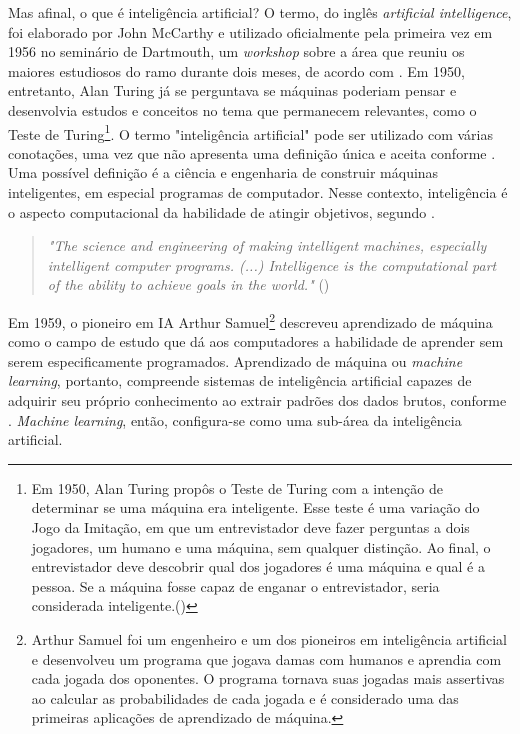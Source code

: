 Mas afinal, o que é inteligência artificial? O termo, do
inglês \textit{artificial intelligence}, foi elaborado por John McCarthy e utilizado 
oficialmente pela primeira vez em 1956 no seminário de 
Dartmouth, um \textit{workshop} sobre a área que reuniu os 
maiores estudiosos do ramo durante dois meses, de acordo com \cite{aima}.
Em 1950, entretanto, Alan Turing já se perguntava se máquinas 
poderiam pensar e desenvolvia estudos e conceitos no tema que permanecem relevantes,
como o Teste de Turing\footnote{Em 1950, Alan Turing propôs o 
Teste de Turing com a intenção de determinar se uma máquina era inteligente. Esse teste é uma variação 
do Jogo da Imitação, em que um entrevistador deve fazer perguntas a dois jogadores, um 
humano e uma máquina, sem qualquer distinção. Ao final, o entrevistador deve
descobrir qual dos jogadores é uma máquina e qual é a pessoa. Se 
a máquina fosse capaz de enganar o entrevistador, seria considerada
inteligente.(\cite{turing})}.
O termo "inteligência artificial" pode ser utilizado com
várias conotações, uma vez que não apresenta uma definição 
única e aceita conforme \citet{wang2019defining}. Uma possível definição
é a ciência e engenharia de 
construir máquinas inteligentes, em especial programas 
de computador. Nesse contexto, inteligência é o aspecto
computacional da habilidade de atingir objetivos, segundo \citet{what-is-ai}.

\begin{quote}
  \textit{"The science and
  engineering of making intelligent machines, 
  especially intelligent computer programs. (...)
  Intelligence is the computational part of the ability 
  to achieve goals in the world."} (\cite{what-is-ai})
\end{quote}

Em 1959, o pioneiro em IA Arthur Samuel\footnote{Arthur Samuel
foi um engenheiro e um dos pioneiros em inteligência artificial e
desenvolveu um programa que jogava damas com humanos e aprendia
com cada jogada dos oponentes. O programa tornava suas jogadas mais 
assertivas ao calcular as probabilidades de cada jogada e é 
considerado uma das primeiras aplicações de aprendizado de máquina.
} descreveu 
aprendizado de máquina como o campo de estudo que dá aos 
computadores a habilidade de aprender sem serem especificamente
programados. Aprendizado de máquina ou \textit{machine learning}, 
portanto, compreende sistemas de inteligência 
artificial capazes de adquirir seu próprio conhecimento 
ao extrair padrões dos dados brutos, conforme \citet{Goodfellow-et-al-2016}.
\textit{Machine learning}, então, configura-se como uma 
sub-área da inteligência artificial.


